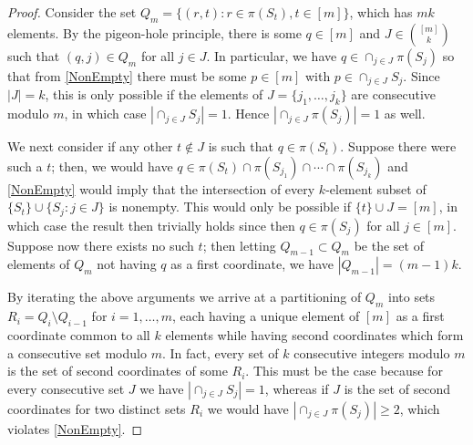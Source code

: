 \documentclass[journal, twocolumn]{IEEEtran}
\begin{document}
\begin{proof} Consider the set $Q_m = \{ (r,t) : r \in \pi(S_t), t \in [m] \}$, which has $mk$ elements. By the pigeon-hole principle, there is some $q \in [m]$ and $J \in {[m] \choose k}$ such that $(q, j) \in Q_m$ for all $j \in J$. In particular, we have $q \in \cap_{j \in J} \pi(S_j)$ so that from \eqref{NonEmpty} there must be some $p \in [m]$ with $p \in \cap_{j \in J} S_j$. Since $|J| = k$, this is only possible if the elements of $J = \{j_1, \ldots, j_k\}$ are consecutive modulo $m$, in which case $|\cap_{j \in J} S_j| = 1$. Hence $|\cap_{j \in J} \pi(S_j)| = 1$ as well.

We next consider if any other $t \notin J$ is such that $q \in \pi(S_t)$. Suppose there were such a $t$; then, we would have $q \in \pi(S_t) \cap \pi(S_{j_1}) \cap \cdots \cap \pi(S_{j_k})$ and \eqref{NonEmpty} would imply that the intersection of every $k$-element subset of $\{S_t\} \cup \{S_j: j \in J\}$ is nonempty. This would only be possible if $\{t\} \cup J = [m]$, in which case the result then trivially holds since then $q \in \pi(S_j)$ for all $j \in [m]$.  Suppose now there exists no such $t$; then letting $Q_{m-1} \subset Q_m$ be the set of elements of $Q_m$ not having $q$ as a first coordinate, we have $|Q_{m-1}| = (m-1)k$. 

By iterating the above arguments we arrive at a partitioning of $Q_m$ into sets $R_i = Q_i \setminus Q_{i-1}$ for $i = 1, \ldots, m$, each having a unique element of $[m]$ as a first coordinate common to all $k$ elements while having second coordinates which form a consecutive set modulo $m$. In fact, every set of $k$ consecutive integers modulo $m$ is the set of second coordinates of some $R_i$. This must be the case because for every consecutive set $J$ we have $|\cap_{j \in J} S_j| = 1$, whereas if $J$ is the set of second coordinates for two distinct sets $R_i$ we would have $|\cap_{j \in J} \pi(S_j)| \geq 2$, which violates \eqref{NonEmpty}. 
\end{proof}
\end{document}
